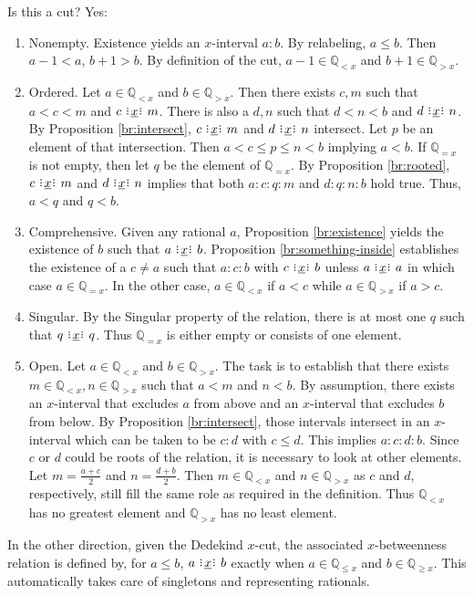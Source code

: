 \documentclass[12pt]{article}
\newcommand{\qcut}[2][x]{\ensuremath{\mathbb{Q}_{#2 #1}}}
\newcommand{\qlt}[1][x]{\qcut[#1]{<}}
\newcommand{\qeq}[1][x]{\qcut[#1]{=}}
\newcommand{\qgt}[1][x]{\qcut[#1]{>}}
\newcommand{\qgeq}[1][x]{\qcut[#1]{\geq}}
\newcommand{\qleq}[1][x]{\qcut[#1]{\leq}}
\begin{document}
Is this a cut? Yes: 
\begin{enumerate}
    \item Nonempty. Existence yields an $x$-interval $a:b$. By relabeling, $a \leq b$. Then $a-1< a$, $b+1 > b$. By definition of the cut, $a-1 \in \qlt$ and $b+1 \in \qgt$.
    \item Ordered. Let $a \in \qlt$ and $b \in \qgt$.  Then there exists $c, m$ such that $a < c < m$ and $c \xrel m$. There is also a $d, n$ such that $d < n< b$  and $d \xrel n$. By Proposition \ref{br:intersect}, $c \xrel m$ and $d \xrel n$ intersect. Let $p$ be an element of that intersection. Then $a < c \leq p \leq n < b$ implying $a < b$.  If $\qeq$ is not empty, then let $q$ be the element of $\qeq$. By Proposition \ref{br:rooted}, $c \xrel m$ and $d \xrel n$ implies that both $a:c:q:m$ and $d:q:n:b$ hold true. Thus, $a < q$ and $q < b$.  
    \item Comprehensive. Given any rational $a$, Proposition \ref{br:existence} yields the existence of $b$ such that $a \xrel b$. Proposition \ref{br:something-inside} establishes the existence of a $c \neq a$ such that $a:c:b$ with $c \xrel b$ unless $a \xrel a$ in which case $a \in \qeq$. In the other case, $a \in \qlt$ if $a < c$ while $a  \in \qgt$ if $a > c$. 
    \item Singular. By the Singular property of the relation, there is at most one $q$ such that $q \xrel q$. Thus $\qeq$ is either empty or consists of one element. 
    \item Open. Let $a\in \qlt$ and $b \in \qgt$. The task is to establish that there exists $m \in \qlt, n \in \qgt$ such that $a < m$ and $n < b$. By assumption, there exists an $x$-interval that excludes $a$ from above and an $x$-interval that excludes $b$ from below. By Proposition \ref{br:intersect}, those intervals intersect in an $x$-interval which can be taken to be $c:d$ with $c \leq d$. This implies $a:c:d:b$. Since $c$ or $d$ could be roots of the relation, it is necessary to look at other elements. Let $m = \frac{a+c}{2}$ and $n = \frac{d+b}{2}$. Then $m \in \qlt$ and $n \in \qgt$ as $c$ and $d$, respectively, still fill the same role as required in the definition. Thus $\qlt$ has no greatest element and $\qgt$ has no least element. 
\end{enumerate}

In the other direction, given the Dedekind $x$-cut, the associated $x$-betweenness relation is defined by, for $a \leq b$, $a \xrel b$ exactly when $a \in \qleq$ and $b \in \qgeq$. This automatically takes care of singletons and representing rationals. 
\end{document}
